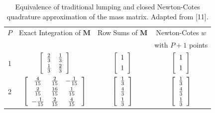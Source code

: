 \begin{table}[!htp]
\centering
\caption{Equivalence of traditional lumping and closed Newton-Cotes quadrature approximation of the mass matrix.  Adapted from [11].}
\begin{tabular}{|c|c|c|c|} 
\hline
  $P$			& Exact Integration of $\mathbf{M}$ 	&  Row Sums of $\mathbf{M}$ &  Newton-Cotes $w$\\
   {}			& 		{}									& 						{} 					&  with $P+1$ points \\
	\hline
				1   	&   
				$ \left[\begin{array}{cc}	\frac{2}{3} & \frac{1}{3} \vspace{3pt}\\  \frac{1}{3} & \frac{2}{3} \end{array}\right] $ & 
				$ \left[ \begin{array}{cc} 1 \vspace{3pt}\\ 1 \end{array} \right]$ & 
				$ \left[ \begin{array}{cc} 1 \vspace{3pt}\\ 1 \end{array} \right]$ \\
					\hline
				2   	&   
				$ \left[\begin{array}{ccc}	\frac{4}{15} & \frac{2}{15} & -\frac{1}{15}\vspace{3pt} \\  
																		\frac{2}{15} & \frac{16}{15} & \frac{1}{15} \vspace{3pt}\\
																		-\frac{1}{15} & \frac{2}{15} & \frac{4}{15}   
				\end{array}\right] $ & 
				$ \left[ \begin{array}{c} \frac{1}{3} \vspace{3pt}\\ \frac{4}{3} \vspace{3pt}\\ \frac{1}{3} \end{array} \right]$ & 
				$ \left[ \begin{array}{c} \frac{1}{3} \vspace{3pt}\\ \frac{4}{3} \vspace{3pt}\\ \frac{1}{3} \end{array} \right]$  \\

\end{tabular}
\end{table}
